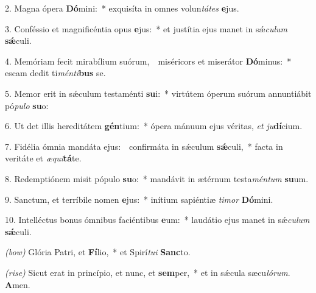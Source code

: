 2. Magna ópera \textbf{Dó}mini:~*
	exquisíta in omnes volun\textit{tá}\textit{tes} \textbf{e}jus.

3. Conféssio et magnificéntia opus \textbf{e}jus:~*
	et justítia ejus manet in s\'{\ae}\textit{cu}\-\textit{lum} \textbf{s\'{\ae}}culi.

4. Memóriam fecit mirabílium suórum,~\GreDagger\
	miséricors et miserátor \textbf{Dó}\-minus:~*
	escam dedit ti\textit{mén}\textit{ti}\textbf{bus} se.

5. Memor erit in s\'{\ae}culum testaménti \textbf{su}i:~*
	virtútem óperum suórum annuntiábit pó\textit{pu}\textit{lo} \textbf{su}o:

6. Ut det illis hereditátem \textbf{gén}ti\-um:~*
	ópera mánuum ejus véritas, \textit{et} \textit{ju}\textbf{dí}\-cium.

7. Fidélia ómnia mandáta ejus:~\GreDagger\
	confirmáta in s\'{\ae}culum \textbf{s\'{\ae}}culi,~*
	facta in veritáte et \textit{æ}\textit{qui}\textbf{tá}te.

8. Redemptiónem misit pópulo \textbf{su}o:~*
	mandávit in ætérnum testa\textit{mén}\textit{tum} \textbf{su}um.

9. Sanctum, et terríbile nomen \textbf{e}jus:~*
	inítium sapiéntiæ \textit{ti}\textit{mor} \textbf{Dó}\-mini.

10. Intelléctus bonus ómnibus faciéntibus \textbf{e}um:~*
	laudátio ejus manet in s\'{\ae}\textit{cu}\textit{lum} \textbf{s\'{\ae}}culi.

\textit{(bow)} Glória Patri, et \textbf{Fí}lio,~*
	et Spirí\textit{tu}\textit{i} \textbf{Sanc}to.

\textit{(rise)} Sicut erat in princípio, et nunc, et \textbf{sem}per,~*
	et in s\'{\ae}cula sæcu\textit{ló}\textit{rum}. \textbf{A}men.